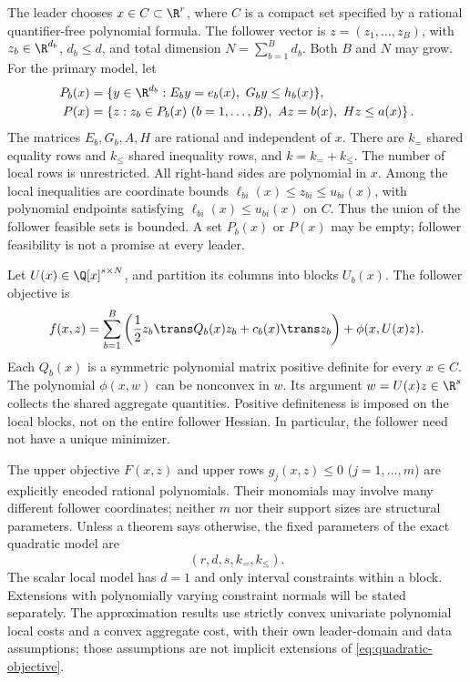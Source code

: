 The leader chooses $x\in C\subset\R^r$, where $C$ is a compact set
specified by a rational quantifier-free polynomial formula. The follower
vector is $z=(z_1,\ldots,z_B)$, with $z_b\in\R^{d_b}$,
$d_b\le d$, and total dimension $N=\sum_{b=1}^B d_b$. Both $B$ and $N$
may grow. For the primary model, let
\begin{align}
 P_b(x)&=\{y\in\R^{d_b}:E_b y=e_b(x),\ G_b y\le h_b(x)\},
 \label{eq:local-polytope}\\
 P(x)&=\left\{z:z_b\in P_b(x)\ (b=1,\ldots,B),\
                     Az=b(x),\ Hz\le a(x)\right\}.
 \label{eq:follower-polytope}
\end{align}
The matrices $E_b,G_b,A,H$ are rational and independent of $x$.
There are $k_{=}$ shared equality rows and $k_{\le}$ shared inequality
rows, and $k=k_=+k_{\le}$. The number of local rows is unrestricted.
All right-hand sides are polynomial in $x$. Among the local inequalities
are coordinate bounds
$\ell_{bi}(x)\le z_{bi}\le u_{bi}(x)$, with polynomial endpoints
satisfying $\ell_{bi}(x)\le u_{bi}(x)$ on $C$.
Thus the union of the follower feasible sets is bounded.
A set $P_b(x)$ or $P(x)$ may be empty; follower feasibility is not a
promise at every leader.

Let $U(x)\in\Q[x]^{s\times N}$, and partition its columns into blocks
$U_b(x)$. The follower objective is
\begin{equation}\label{eq:quadratic-objective}
 f(x,z)=\sum_{b=1}^B\left(\frac12 z_b\trans Q_b(x)z_b+
                c_b(x)\trans z_b\right)+\phi(x,U(x)z).
\end{equation}
Each $Q_b(x)$ is a symmetric polynomial matrix positive definite for
every $x\in C$. The polynomial $\phi(x,w)$ can be nonconvex in $w$.
Its argument $w=U(x)z\in\R^s$ collects the shared aggregate quantities.
Positive definiteness is imposed on the local blocks, not on the entire
follower Hessian. In particular, the follower need not have a unique
minimizer.

The upper objective $F(x,z)$ and upper rows $g_j(x,z)\le0$
($j=1,\ldots,m$) are explicitly encoded rational polynomials.
Their monomials may involve many different follower coordinates; neither
$m$ nor their support sizes are structural parameters. Unless a theorem
says otherwise, the fixed parameters of the exact quadratic model are
\begin{equation}\label{eq:structural-parameters}
                    (r,d,s,k_=,k_{\le}).
\end{equation}
The scalar local model has $d=1$ and only interval constraints within a
block. Extensions with polynomially varying constraint normals will be
stated separately. The approximation results use strictly convex
univariate polynomial local costs and a convex aggregate cost, with their
own leader-domain and data assumptions; those assumptions are not
implicit extensions of \eqref{eq:quadratic-objective}.

